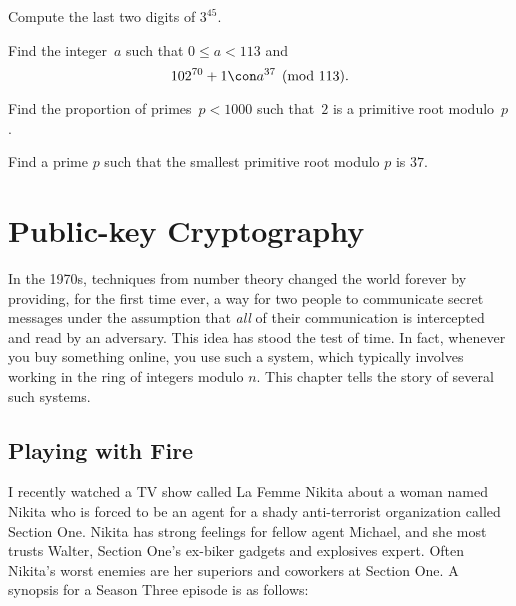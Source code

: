 \begin{exercises}
\item\label{ex:pow} Compute the last two digits
of $3^{45}$.

\item\label{ex:pow2}
Find the integer~$a$ such that $0\leq a < 113$ and
$$
  102^{70}+1 \con a^{37}\pmod{113}.
$$

\item  \label{ex:comp_prop} Find the proportion of primes~$p<1000$
such that~$2$ is a primitive root modulo~$p$.

\item \label{ex:pr2} Find a prime $p$ such that the smallest
primitive root modulo $p$ is $37$.

\end{exercises}



\chapter{Public-key Cryptography}\label{ch:crypto}

In the 1970s, techniques from number theory changed the world forever
by providing, for the first time ever, a way for two people to
communicate secret messages under the assumption that {\em all} of
their communication is intercepted and read by an adversary.  This
idea has stood the test of time.  In fact, whenever you buy something
online, you use such a system, which typically involves working in the
ring of integers modulo $n$.  This chapter tells the story of several
such systems.

\section{Playing with Fire}

I recently watched a TV show
called La Femme Nikita about a woman
named Nikita who is forced to be an agent for a shady
anti-terrorist organization
called Section One.  Nikita has strong feelings for fellow agent
Michael, and she most trusts Walter, Section One's
ex-biker gadgets and explosives expert.  Often Nikita's worst enemies
are her superiors and coworkers at Section One.
A synopsis for a Season Three episode is as follows:

